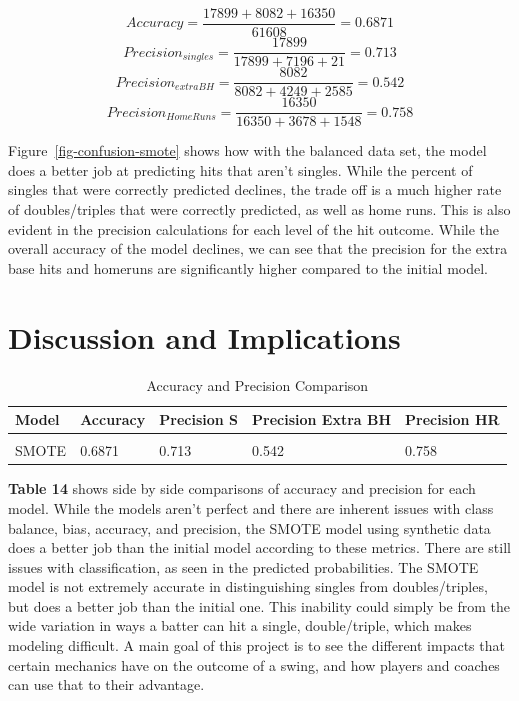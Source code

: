 \documentclass[
  letterpaper,
  DIV=11,
  numbers=noendperiod]{scrartcl}
\begin{document}
\[ Accuracy = \frac{17899 + 8082 + 16350}{61608} = 0.6871\]
\[Precision_{singles} = \frac{17899}{17899 + 7196 + 21} = 0.713\]
\[Precision_{extraBH} = \frac{8082}{8082 + 4249 + 2585} = 0.542\]
\[Precision_{HomeRuns} = \frac{16350}{16350 + 3678 + 1548} = 0.758\]

Figure~\ref{fig-confusion-smote} shows how with the balanced data set,
the model does a better job at predicting hits that aren't singles.
While the percent of singles that were correctly predicted declines, the
trade off is a much higher rate of doubles/triples that were correctly
predicted, as well as home runs. This is also evident in the precision
calculations for each level of the hit outcome. While the overall
accuracy of the model declines, we can see that the precision for the
extra base hits and homeruns are significantly higher compared to the
initial model.

\section{Discussion and Implications}\label{discussion-and-implications}

\begin{table}[!h]
\centering
\caption{\label{tab:unnamed-chunk-69}Accuracy and Precision Comparison}
\centering
\begin{tabular}[t]{lllll}
\toprule
Model & Accuracy & Precision S & Precision Extra BH & Precision HR\\
\midrule
\cellcolor{gray!10}{Initial} & \cellcolor{gray!10}{0.7182} & \cellcolor{gray!10}{0.736} & \cellcolor{gray!10}{0.418} & \cellcolor{gray!10}{0.641}\\
SMOTE & 0.6871 & 0.713 & 0.542 & 0.758\\
\bottomrule
\end{tabular}
\end{table}

\textbf{Table 14} shows side by side comparisons of accuracy and
precision for each model. While the models aren't perfect and there are
inherent issues with class balance, bias, accuracy, and precision, the
SMOTE model using synthetic data does a better job than the initial
model according to these metrics. There are still issues with
classification, as seen in the predicted probabilities. The SMOTE model
is not extremely accurate in distinguishing singles from
doubles/triples, but does a better job than the initial one. This
inability could simply be from the wide variation in ways a batter can
hit a single, double/triple, which makes modeling difficult. A main goal
of this project is to see the different impacts that certain mechanics
have on the outcome of a swing, and how players and coaches can use that
to their advantage.
\end{document}
